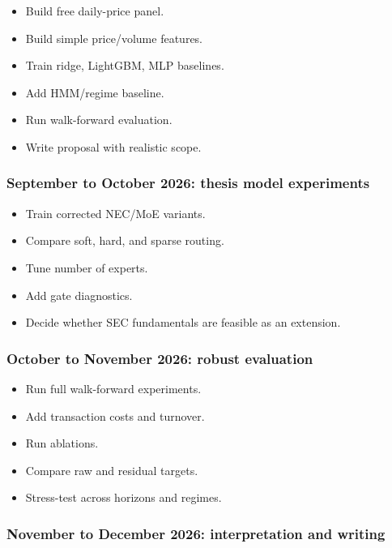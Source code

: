 \begin{itemize}
\tightlist
\item
  Build free daily-price panel.
\item
  Build simple price/volume features.
\item
  Train ridge, LightGBM, MLP baselines.
\item
  Add HMM/regime baseline.
\item
  Run walk-forward evaluation.
\item
  Write proposal with realistic scope.
\end{itemize}

\subsubsection{September to October 2026: thesis model
experiments}\label{september-to-october-2026-thesis-model-experiments}

\begin{itemize}
\tightlist
\item
  Train corrected NEC/MoE variants.
\item
  Compare soft, hard, and sparse routing.
\item
  Tune number of experts.
\item
  Add gate diagnostics.
\item
  Decide whether SEC fundamentals are feasible as an extension.
\end{itemize}

\subsubsection{October to November 2026: robust
evaluation}\label{october-to-november-2026-robust-evaluation}

\begin{itemize}
\tightlist
\item
  Run full walk-forward experiments.
\item
  Add transaction costs and turnover.
\item
  Run ablations.
\item
  Compare raw and residual targets.
\item
  Stress-test across horizons and regimes.
\end{itemize}

\subsubsection{November to December 2026: interpretation and
writing}\label{november-to-december-2026-interpretation-and-writing}

